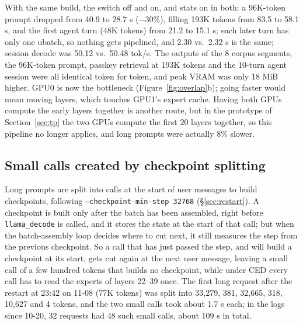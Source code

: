 \documentclass[11pt,a4paper]{article}
\newcommand{\code}[1]{\texttt{#1}}
\newcommand{\tps}{tok/s}
\begin{document}
With the same build, the switch off and on, and stats on in both: a 96K-token prompt dropped from 40.9 to 28.7 s ($-$30\%), filling 193K tokens from 83.5 to 58.1 s, and the first agent turn (48K tokens) from 21.2 to 15.1 s; each later turn has only one ubatch, so nothing gets pipelined, and 2.30 vs.\ 2.32 s is the same; session decode was 50.12 vs.\ 50.48 \tps{}. The outputs of the 8 corpus segments, the 96K-token prompt, passkey retrieval at 193K tokens and the 10-turn agent session were all identical token for token, and peak VRAM was only 18 MiB higher. GPU0 is now the bottleneck (Figure~\ref{fig:overlap}b); going faster would mean moving layers, which touches GPU1's expert cache. Having both GPUs compute the early layers together is another route, but in the prototype of Section~\ref{sec:tp} the two GPUs compute the first 20 layers together, so this pipeline no longer applies, and long prompts were actually 8\% slower.

\subsection{Small calls created by checkpoint splitting}
\label{sec:ckptsplit}

Long prompts are split into calls at the start of user messages to build checkpoints, following \code{--checkpoint-min-step 32768} (\S\ref{sec:restart}). A checkpoint is built only after the batch has been assembled, right before \code{llama\_decode} is called, and it stores the state at the start of that call; but when the batch-assembly loop decides where to cut next, it still measures the step from the previous checkpoint. So a call that has just passed the step, and will build a checkpoint at its start, gets cut again at the next user message, leaving a small call of a few hundred tokens that builds no checkpoint, while under CED every call has to read the experts of layers 22--39 once. The first long request after the restart at 23:42 on 11-08 (77K tokens) was split into 33,279, 381, 32,665, 318, 10,627 and 4 tokens, and the two small calls took about 1.7 s each; in the logs since 10-20, 32 requests had 48 such small calls, about 109 s in total.
\end{document}
